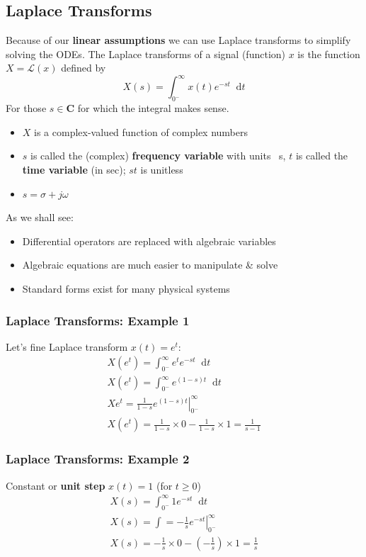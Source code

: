 \documentclass[class=report, crop=false, 12pt,a4paper, tikz, border=4mm]{standalone}
\newcommand{\dif}{\mathop{}\!\mathrm{d}}
\newcommand{\Lagr}{\mathcal{L}}
\begin{document}
\subsection{Laplace Transforms}
Because of our \textbf{linear assumptions} we can use Laplace transforms to simplify solving the ODEs. The Laplace transforms of a signal (function) $x$ is the function $X = \Lagr (x)$ defined by
\begin{equation}
  X(s) = \int_{0^-}^\infty x(t) e^{-st} \dif t
\end{equation}
For those $s \in \textbf{C}$ for which the integral makes sense.
\begin{itemize}
  \item $X$ is a complex-valued function of complex numbers
  \item $s$ is called the (complex) \textbf{frequency variable} with units \si{\per\second}, $t$ is called the \textbf{time variable} (in sec); $st$ is unitless
  \item $s = \sigma + j \omega$
\end{itemize}
As we shall see:
\begin{itemize}
  \item Differential operators are replaced with algebraic variables
  \item Algebraic equations are much easier to manipulate \& solve
  \item Standard forms exist for many physical systems
\end{itemize}
\subsubsection{Laplace Transforms: Example 1}
Let's fine Laplace transform $x(t) = e^t$:
\begin{gather}
  X(e^t) = \int_{0^-}^\infty e^t e^{-st} \dif t\\
  X(e^t) = \int_{0^-}^\infty e^{(1-s)t} \dif t\\
  X{e^t} = \left. \frac{1}{1-s}e^{(1-s)t}\right|_{0^-}^\infty \\
  X(e^t) = \frac{1}{1-s} \times 0 - \frac{1}{1-s} \times 1 = \frac{1}{s-1}
\end{gather}
\subsubsection{Laplace Transforms: Example 2}
Constant or \textbf{unit step} $x(t) =1$ (for $t \geq 0$)
\begin{gather}
  X(s) = \int_{0^-}^{\infty} 1 e^{-st}\dif t\\
  X(s) = \int = \left. -\frac{1}{s} e^{-st} \right|_{0^-}^\infty\\
  X(s) = - \frac{1}{s} \times 0 - (- \frac{1}{s}) \times 1 = \frac{1}{s}
\end{gather}
\end{document}
